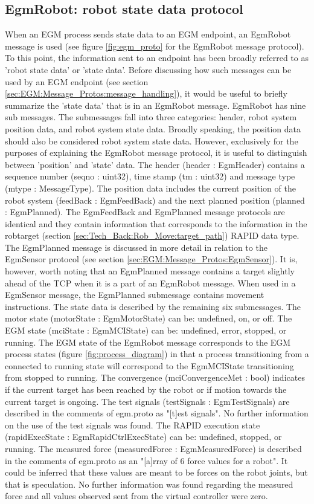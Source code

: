 \documentclass{cslthse-msc}
\begin{document}
\subsection{EgmRobot: robot state data protocol}
\label{sec:EGM:Message_Protos:EgmRobot}
When an EGM process sends state data to an EGM endpoint, an EgmRobot message is used (see figure \ref{fig:egm_proto} for the EgmRobot message protocol). To this point, the information sent to an endpoint has been broadly referred to as 'robot state data' or 'state data'. Before discussing how such messages can be used by an EGM endpoint (see section \ref{sec:EGM:Message_Protos:message_handling}), it would be useful to briefly summarize the 'state data' that is in an EgmRobot message. EgmRobot has nine sub messages. The submessages fall into three categories: header, robot system position data, and robot system state data. Broadly speaking, the position data should also be considered robot system state data. However, exclusively for the purposes of explaining the EgmRobot message protocol, it is useful to distinguish between 'position' and 'state' data. The header (header : EgmHeader) contains a sequence number (seqno : uint32), time stamp (tm : uint32) and message type (mtype : MessageType). The position data includes the current position of the robot system (feedBack : EgmFeedBack) and the next planned position (planned : EgmPlanned). The EgmFeedBack and EgmPlanned message protocols are identical and they contain information that corresponds to the information in the robtarget (section \ref{sec:Tech_Back:Rob_Move:target_path}) RAPID data type. The EgmPlanned message is discussed in more detail in relation to the EgmSensor protocol (see section \ref{sec:EGM:Message_Protos:EgmSensor}). It is, however, worth noting that an EgmPlanned message contains a target slightly ahead of the TCP when it is a part of an EgmRobot message. When used in a EgmSensor message, the EgmPlanned submessage contains movement instructions. The state data is described by the remaining six submessages. The motor state (motorState : EgmMotorState) can be: undefined, on, or off. The EGM state (mciState : EgmMCIState) can be: undefined, error, stopped, or running. The EGM state of the EgmRobot message corresponds to the EGM process states (figure \ref{fig:process_diagram}) in that a process transitioning from a connected to running state will correspond to the EgmMCIState transitioning from stopped to running. The convergence (mciConvergenceMet : bool) indicates if the current target has been reached by the robot or if motion towards the current target is ongoing. The test signals (testSignals : EgmTestSignals) are described in the comments of egm.proto as "[t]est signals". No further information on the use of the test signals was found. The RAPID execution state (rapidExecState : EgmRapidCtrlExecState) can be: undefined, stopped, or running. The measured force (measuredForce : EgmMeasuredForce) is described in the comments of egm.proto as an "[a]rray of 6 force values for a robot". It could be inferred that these values are meant to be forces on the robot joints, but that is speculation. No further information was found regarding the measured force and all values observed sent from the virtual controller were zero.
\end{document}
